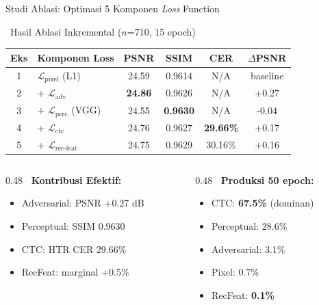\documentclass[aspectratio=169,10pt,t]{beamer}
\begin{document}
\begin{frame}[shrink=5]{Studi Ablasi: Optimasi 5 Komponen \textit{Loss} Function}
    \begin{block}{\faSearch~Hasil Ablasi Inkremental ($n$=710, 15 epoch)}
        \centering
        \tiny
        \begin{tabular}{clcccc}
            \toprule
            \textbf{Eks} & \textbf{Komponen Loss} & \textbf{PSNR} & \textbf{SSIM} & \textbf{CER} & \textbf{$\Delta$PSNR} \\
            \midrule
            1 & $\mathcal{L}_{\text{pixel}}$ (L1) & 24.59 & 0.9614 & N/A & baseline \\
            2 & + $\mathcal{L}_{\text{adv}}$ & \textbf{24.86} & 0.9626 & N/A & +0.27 \\
            3 & + $\mathcal{L}_{\text{perc}}$ (VGG) & 24.55 & \textbf{0.9630} & N/A & -0.04 \\
            4 & + $\mathcal{L}_{\text{ctc}}$ & 24.76 & 0.9627 & \textbf{29.66\%} & +0.17 \\
            5 & + $\mathcal{L}_{\text{rec-feat}}$ & 24.75 & 0.9629 & 30.16\% & +0.16 \\
            \bottomrule
        \end{tabular}
    \end{block}
    
    \vspace{0.2em}
    \begin{columns}[T]
        \begin{column}{0.48\textwidth}
            \textbf{\faCheckCircle~Kontribusi Efektif:}
            {\small
            \begin{itemize}
                \setlength\itemsep{0em}
                \item Adversarial: PSNR +0.27 dB
                \item Perceptual: SSIM 0.9630
                \item CTC: HTR CER 29.66\%
                \item RecFeat: marginal +0.5\%
            \end{itemize}
            }
        \end{column}
        \begin{column}{0.48\textwidth}
            \textbf{\faLightbulb~Produksi 50 epoch:}
            {\small
            \begin{itemize}
                \setlength\itemsep{0em}
                \item CTC: \textbf{67.5\%} (dominan)
                \item Perceptual: 28.6\%
                \item Adversarial: 3.1\%
                \item Pixel: 0.7\%
                \item RecFeat: \textbf{0.1\%}
            \end{itemize}
            }
        \end{column}
    \end{columns}
    

\end{frame}
\end{document}
